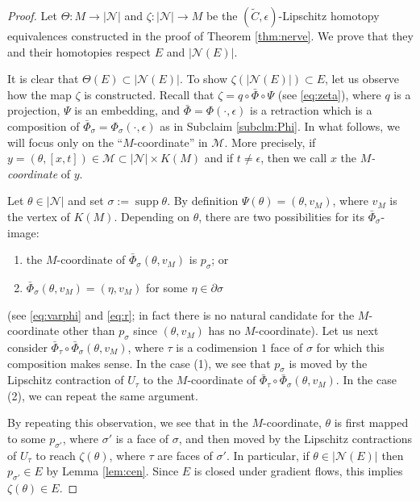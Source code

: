 \documentclass[a4paper,12pt]{amsart}
\theoremstyle{plain}
\theoremstyle{definition}
\numberwithin{thm}{section}
\numberwithin{equation}{section}
\DeclareMathOperator{\supp}{supp}
\begin{document}
\begin{proof}
Let $\Theta:M\to|\mathcal N|$ and $\zeta:|\mathcal N|\to M$ be the $(\tilde C,\epsilon)$-Lipschitz homotopy equivalences constructed in the proof of Theorem \ref{thm:nerve}.
We prove that they and their homotopies respect $E$ and $|\mathcal N(E)|$.

It is clear that $\Theta(E)\subset |\mathcal N(E)|$.
To show $\zeta(|\mathcal N(E)|)\subset E$, let us observe how the map $\zeta$ is constructed.
Recall that $\zeta=q\circ\bar\Phi\circ\Psi$ (see \eqref{eq:zeta}), where $q$ is a projection, $\Psi$ is an embedding, and $\bar\Phi=\Phi(\cdot,\epsilon)$ is a retraction which is a composition of $\bar\Phi_\sigma=\Phi_\sigma(\cdot,\epsilon)$ as in Subclaim \ref{subclm:Phi}.
In what follows, we will focus only on the ``$M$-coordinate'' in $\mathcal M$.
More precisely, if $y=(\theta,[x,t])\in\mathcal M\subset |\mathcal N|\times K(M)$ and if $t\neq\epsilon$, then we call $x$ the \textit{$M$-coordinate} of $y$.

Let $\theta\in|\mathcal N|$ and set $\sigma:=\supp\theta$.
By definition $\Psi(\theta)=(\theta,v_M)$, where $v_M$ is the vertex of $K(M)$.
Depending on $\theta$, there are two possibilities for its $\bar\Phi_\sigma$-image:
\begin{enumerate}
\item the $M$-coordinate of $\bar\Phi_\sigma(\theta,v_M)$ is $p_\sigma$; or
\item $\bar\Phi_\sigma(\theta,v_M)=(\eta,v_M)$ for some $\eta\in\partial\sigma$
\end{enumerate}
(see \eqref{eq:varphi} and \eqref{eq:r}; in fact there is no natural candidate for the $M$-coordinate other than $p_\sigma$ since $(\theta,v_M)$ has no $M$-coordinate).
Let us next consider $\bar\Phi_\tau\circ\bar\Phi_\sigma(\theta,v_M)$, where $\tau$ is a codimension $1$ face of $\sigma$ for which this composition makes sense.
In the case (1), we see that $p_\sigma$ is moved by the Lipschitz contraction of $U_\tau$ to the $M$-coordinate of $\bar\Phi_\tau\circ\bar\Phi_\sigma(\theta,v_M)$.
In the case (2), we can repeat the same argument.

By repeating this observation, we see that in the $M$-coordinate, $\theta$ is first mapped to some $p_{\sigma'}$, where $\sigma'$ is a face of $\sigma$, and then moved by the Lipschitz contractions of $U_\tau$ to reach $\zeta(\theta)$, where $\tau$ are faces of $\sigma'$.
In particular, if $\theta\in|\mathcal N(E)|$ then $p_{\sigma'}\in E$ by Lemma \ref{lem:cen}.
Since $E$ is closed under gradient flows, this implies $\zeta(\theta)\in E$.


\end{proof}
\end{document}
